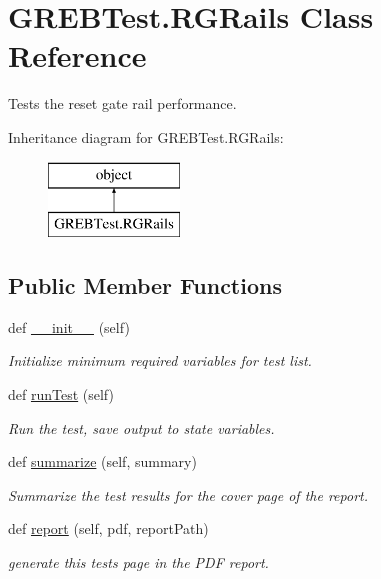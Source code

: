 \hypertarget{class_g_r_e_b_test_1_1_r_g_rails}{}\section{G\+R\+E\+B\+Test.\+R\+G\+Rails Class Reference}
\label{class_g_r_e_b_test_1_1_r_g_rails}


Tests the reset gate rail performance.  


Inheritance diagram for G\+R\+E\+B\+Test.\+R\+G\+Rails\+:\begin{figure}[H]
\begin{center}
\leavevmode
\includegraphics[height=2.000000cm]{class_g_r_e_b_test_1_1_r_g_rails}
\end{center}
\end{figure}
\subsection*{Public Member Functions}
\begin{DoxyCompactItemize}
\item 
def \hyperlink{class_g_r_e_b_test_1_1_r_g_rails_ad5c0e5b8b5c15405baa9a904cb88ba29}{\+\_\+\+\_\+init\+\_\+\+\_\+} (self)
\begin{DoxyCompactList}\small\item\em Initialize minimum required variables for test list. \end{DoxyCompactList}\item 
def \hyperlink{class_g_r_e_b_test_1_1_r_g_rails_a0626f52ae5a531fbd25a5e3e0e4fb532}{run\+Test} (self)
\begin{DoxyCompactList}\small\item\em Run the test, save output to state variables. \end{DoxyCompactList}\item 
def \hyperlink{class_g_r_e_b_test_1_1_r_g_rails_aab4387f319014e2b2cdc5ca58b15e780}{summarize} (self, summary)
\begin{DoxyCompactList}\small\item\em Summarize the test results for the cover page of the report. \end{DoxyCompactList}\item 
def \hyperlink{class_g_r_e_b_test_1_1_r_g_rails_a49d56a3d9cf180e8d128136e9ddb23e2}{report} (self, pdf, report\+Path)
\begin{DoxyCompactList}\small\item\em generate this test\textquotesingle{}s page in the P\+DF report. \end{DoxyCompactList}\end{DoxyCompactItemize}


